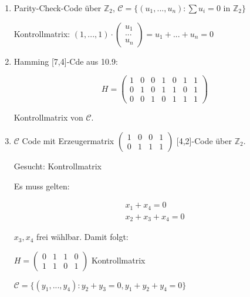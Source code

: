   \begin{enumerate}[label=(\alph*)]
    \item Parity-Check-Code über $\mathbb{Z}_2$, $\mathcal{C} = \{(u_1, ..., u_n) : \sum u_i = 0$ in $\mathbb{Z}_2 \}$

    Kontrollmatrix: $(1,...,1) \cdot \begin{pmatrix}u_1 \\ ... \\ u_n \end{pmatrix}= u_1 + ... + u_n = 0$

    \item Hamming [7,4]-Cde aus 10.9:

    \begin{equation*}
      H = \begin{pmatrix}1 & 0 & 0 & 1 & 0 & 1 & 1 \\ 0 & 1 & 0 & 1 & 1 & 0 & 1 \\ 0 & 0 & 1 & 0 & 1 & 1 & 1 \end{pmatrix}
    \end{equation*}

    Kontrollmatrix von $\mathcal{C}$.

    \item $\mathcal{C}$ Code mit Erzeugermatrix $\begin{pmatrix}1 & 0 & 0 & 1 \\ 0 & 1 & 1 & 1 \end{pmatrix}$ [4,2]-Code über $\mathbb{Z}_2$.

    Gesucht: Kontrollmatrix

    \par \medskip

    Es muss gelten: 

    \begin{align*}
      x_1 + x_4 = 0 \\
      x_2 + x_3 + x_4 = 0
    \end{align*}

    $x_3, x_4$ frei wählbar. Damit folgt:

    \begin{center}
      $H = \begin{pmatrix}0 & 1 & 1 & 0 \\ 1 & 1 & 0 & 1 \end{pmatrix}$ Kontrollmatrix
    \end{center}

    $\mathcal{C} = \{(y_1, ..., y_4) : y_2 + y_3 = 0, y_1 + y_2 + y_4 = 0 \}$
  \end{enumerate}


  